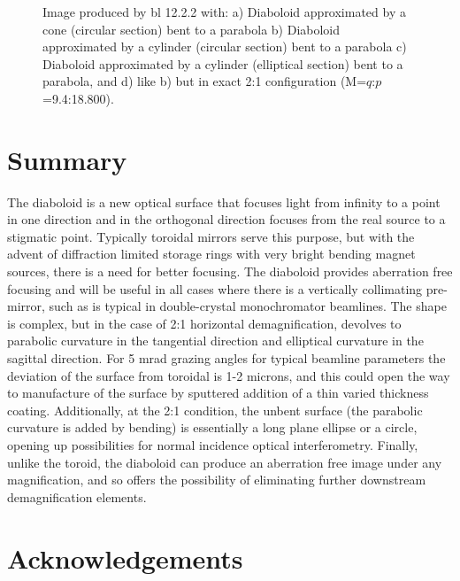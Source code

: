 \documentclass{iucr}              %
\begin{document}
\begin{figure}
\caption{ Image produced by bl 12.2.2 with: 
a) Diaboloid approximated by a cone (circular section) bent to a parabola b) Diaboloid approximated by a cylinder (circular section) bent to a parabola c) Diaboloid approximated by a cylinder (elliptical section) bent to a parabola, and d) like b) but in exact 2:1 configuration (M=$q$:$p$=9.4:18.800).
}
\end{figure}


\section{Summary}
\label{sec:summary}

The diaboloid is a new optical surface that focuses light from infinity to a point in one direction and in the orthogonal direction focuses from the real source to a stigmatic point.  Typically toroidal mirrors serve this purpose, but with the advent of diffraction limited storage rings with very bright bending magnet sources, there is a need for better focusing. The diaboloid provides aberration free focusing and will be useful in all cases where there is a vertically collimating pre-mirror, such as is typical in double-crystal monochromator beamlines. The shape is complex, but in the case of 2:1 horizontal demagnification, devolves to parabolic curvature in the tangential direction and elliptical curvature in the sagittal direction. For 5 mrad grazing angles for typical beamline parameters the deviation of the surface from toroidal is 1-2 microns, and this could open the way to manufacture of the surface by sputtered addition of a thin varied thickness coating.  Additionally, at the 2:1 condition, the unbent surface (the parabolic curvature is added by bending) is essentially a long plane ellipse or a circle, opening up possibilities for normal incidence optical interferometry.  Finally, unlike the toroid, the diaboloid can produce an aberration free image under any magnification, and so offers the possibility of eliminating further downstream demagnification elements. 







\section{Acknowledgements}       
 
\end{document}
